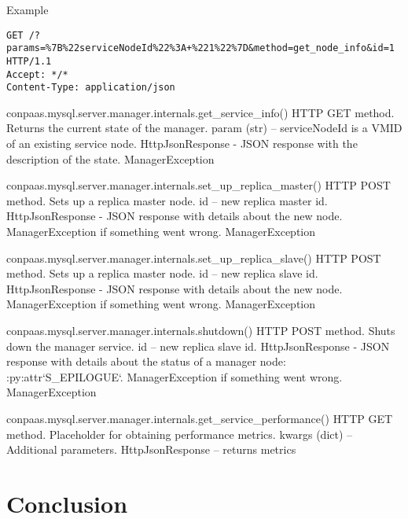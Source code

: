 \documentclass[a4paper,10pt]{article}
\begin{document}
Example
\begin{verbatim}
GET /?params=%7B%22serviceNodeId%22%3A+%221%22%7D&method=get_node_info&id=1 HTTP/1.1
Accept: */*
Content-Type: application/json
\end{verbatim}

\noindent\conapi
{ conpaas.mysql.server.manager.internals.get\_service\_info()}
{HTTP GET method. Returns the current state of the manager.}
{param (str) -- serviceNodeId is a VMID of an existing service node.}
{HttpJsonResponse - JSON response with the description of the state.}
{ManagerException}

\noindent\conapi
{ conpaas.mysql.server.manager.internals.set\_up\_replica\_master()}
{HTTP POST method. Sets up a replica master node.}
{ id -- new replica master id.}
{HttpJsonResponse - JSON response with details about the new
      node. ManagerException if something went wrong.}
{ManagerException}
     
\noindent\conapi
{ conpaas.mysql.server.manager.internals.set\_up\_replica\_slave()}
{HTTP POST method. Sets up a replica master node.}
{  id -- new replica slave id.}
{ HttpJsonResponse - JSON response with details about the new
      node. ManagerException if something went wrong.}
{ManagerException}


\noindent\conapi
{ conpaas.mysql.server.manager.internals.shutdown()}
{HTTP POST method. Shuts down the manager service.}
{  id -- new replica slave id.}
{ HttpJsonResponse - JSON response with details about the status
      of a manager node: :py:attr`S\_EPILOGUE`. ManagerException if
      something went wrong.}
{ManagerException}

\noindent\conapi
{ conpaas.mysql.server.manager.internals.get\_service\_performance()}
{ HTTP GET method. Placeholder for obtaining performance metrics.}
{ kwargs (dict) -- Additional parameters.}
{HttpJsonResponse -- returns metrics}
{}

\section{Conclusion}

\newpage
\vspace{4mm}
\end{document}

